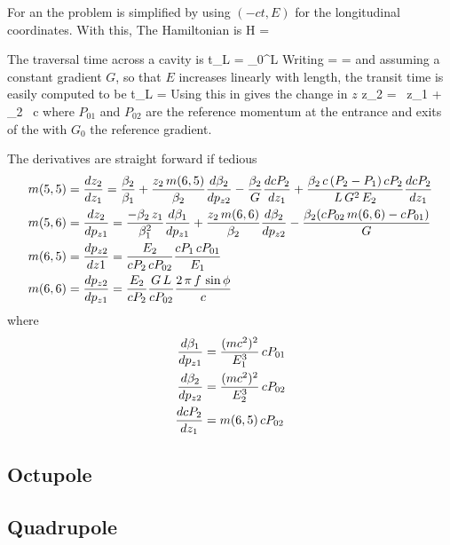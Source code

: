 \documentclass{book}
\begin{document}
For an  the problem is simplified by using $(-ct, E)$ for
the longitudinal coordinates. With this, The Hamiltonian is
\Begineq
  H = 
\Endeq

The traversal time across a cavity is
\Begineq
  t_L = \int_0^L 
\Endeq
Writing
\Begineq
   =  = 
\Endeq
and assuming a constant gradient $G$, so that $E$ increases linearly
with length, the transit time is easily computed to be
\Begineq
  t_L = 
\Endeq
Using this in  gives the change in $z$
\Begineq
  z_2 =  \, z_1 + 
  \beta_2 \, c 
\Endeq
where $P_{01}$ and $P_{02}$ are the reference momentum at the entrance
and exits of the  with $G_0$ the reference gradient. 

The derivatives are straight forward if tedious
\begin{align}
  m(5,5) &= \frac{dz_2}{dz_1} = 
    \frac{\beta_2}{\beta_1} + 
    \frac{z_2 \, m(6,5)}{\beta_2} \frac{d\beta_2}{dp_{z2}} - 
    \frac{\beta_2}{G} \frac{dcP_2}{dz_1} +
    \frac{\beta_2 \, c \, (P_2 - P_1) \, c P_2}{L \, G^2 \, E_2} 
      \frac{dcP_2}{dz_1} \nonumber \\
  m(5,6) &= \frac{dz_2}{dp_{z1}} = 
    \frac{-\beta_2 \, z_1}{\beta_1^2} \frac{d\beta_1}{dp_{z1}} + 
    \frac{z_2 \, m(6,6)}{\beta_2} \frac{d\beta_2}{dp_{z2}} -
    \frac{\beta_2 ( c P_{02} \, m(6,6) - c P_{01})}{G} \nonumber \\
  m(6,5) &= \frac{dp_{z2}}{dz1} =
    \frac{E_2}{cP_2 \, cP_{02}} \frac{cP_1 \, cP_{01}}{E_1}  \\
  m(6,6) &= \frac{dp_{z2}}{dp_{z1}} = 
    \frac{E_2}{cP_2} \frac{G \, L}{c P_{02}} \frac{2 \, \pi \, f \, \sin\phi}{c}
    \nonumber
\end{align}
where
\begin{align}
  \frac{d\beta_1}{dp_{z1}}  &= \frac{(mc^2)^2}{E_1^3} \, cP_{01} \nonumber \\
  \frac{d\beta_2}{dp_{z2}}  &= \frac{(mc^2)^2}{E_2^3} \, cP_{02} \\
  \frac{dcP_2}{dz_1}        &= m(6,5) \, cP_{02}  \nonumber
\end{align}

\subsection{Octupole}

\subsection{Quadrupole}
\end{document}
